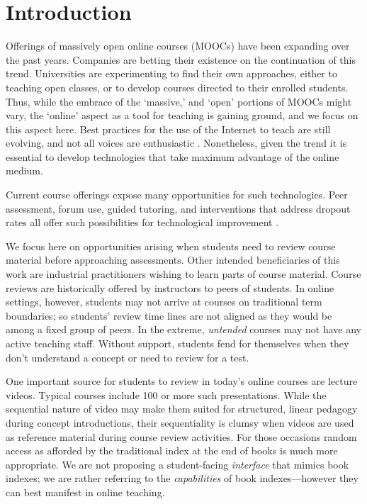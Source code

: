 \section{Introduction}
\label{sec:intro}

Offerings of massively open online courses (MOOCs) have been expanding
over the past years. Companies are betting their existence on the
continuation of this trend. Universities are experimenting to find
their own approaches, either to teaching open classes, or to develop
courses directed to their enrolled students. Thus, while the embrace
of the `massive,' and `open' portions of MOOCs might vary, the
`online' aspect as a tool for teaching is gaining ground, and we focus
on this aspect here. Best practices for the use of the Internet to
teach are still evolving, and not all voices are enthusiastic
\cite{Eckerdal2014}. Nonetheless, given the trend it is essential to
develop technologies that take maximum advantage of the online medium.

Current course offerings expose many opportunities for such
technologies. Peer assessment, forum use, guided tutoring, and
interventions that address dropout rates all offer such possibilities
for technological improvement \cite{Piech2013,
  balfour2013,Coetzee2014, agrawal2015, halawa2014dropout,
  yang2013turn}.

We focus here on opportunities arising when students need to review
course material before approaching assessments. Other intended
beneficiaries of this work are industrial practitioners wishing to
learn parts of course material.  Course reviews are historically
offered by instructors to peers of students. In online settings,
however, students may not arrive at courses on traditional term
boundaries; so students' review time lines are not aligned as they
would be among a fixed group of peers. In the extreme,
\textit{untended} courses may not have any active teaching
staff. Without support, students fend for themselves when they don't
understand a concept or need to review for a test.

One important source for students to review in today's online courses
are lecture videos. Typical courses include 100 or more such
presentations. While the sequential nature of video may make them
suited for structured, linear pedagogy during concept introductions,
their sequentiality is clumsy when videos are used as reference
material during course review activities. For those occasions random
access as afforded by the traditional index at the end of books is
much more appropriate. We are not proposing a student-facing {\em
  interface} that mimics book indexes; we are rather referring to the
{\em capabilities} of book indexes---however they can best manifest in
online teaching.

